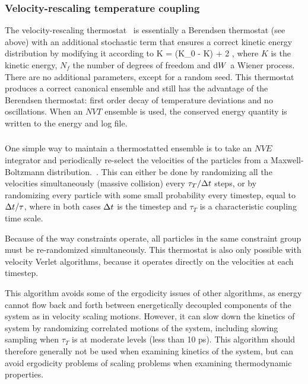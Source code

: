 \documentclass[11pt,a4paper,twoside]{article}
\begin{document}
\subsubsection{Velocity-rescaling temperature coupling}
The velocity-rescaling thermostat~\cite{Bussi2007a} is essentially a Berendsen
thermostat (see above) with an additional stochastic term that ensures
a correct kinetic energy distribution by modifying it according to
\beq
\de K = (K_0 - K)  + 2  ,
\label{eqn:vrescale}
\eeq
where $K$ is the kinetic energy, $N_f$ the number of degrees of freedom and $\mbox{d} W$ a Wiener process.
There are no additional parameters, except for a random seed.
This thermostat produces a correct canonical ensemble and still has
the advantage of the Berendsen thermostat: first order decay of
temperature deviations and no oscillations. When an $NVT$ ensemble is used, the conserved energy quantity
is written to the energy and log file.  

\subsubsection{}
One simple way to maintain a thermostatted ensemble is to take an
$NVE$ integrator and periodically re-select the velocities of the
particles from a Maxwell-Boltzmann distribution.~\cite{Andersen80}.
This can either be done by randomizing all the velocities
simultaneously (massive collision) every $\tau_T/{\Delta t}$ steps, or by
randomizing every particle with some small probability every timestep,
equal to ${\Delta t}/\tau$, where in both cases ${\Delta t}$ is the timestep and
$\tau_T$ is a characteristic coupling time scale.

Because of the way constraints operate, all particles in the same
constraint group must be re-randomized simultaneously.  This
thermostat is also only possible with velocity Verlet algorithms,
because it operates directly on the velocities at each timestep.

This algorithm avoids some of the ergodicity issues of other
algorithms, as energy cannot flow back and forth between energetically
decoupled components of the system as in velocity scaling motions.
However, it can slow down the kinetics of system by randomizing
correlated motions of the system, including slowing sampling when
$\tau_T$ is at moderate levels (less than 10 ps). This algorithm
should therefore generally not be used when examining kinetics of the
system, but can avoid ergodicity problems of scaling problems when
examining thermodynamic properties.
\end{document}
